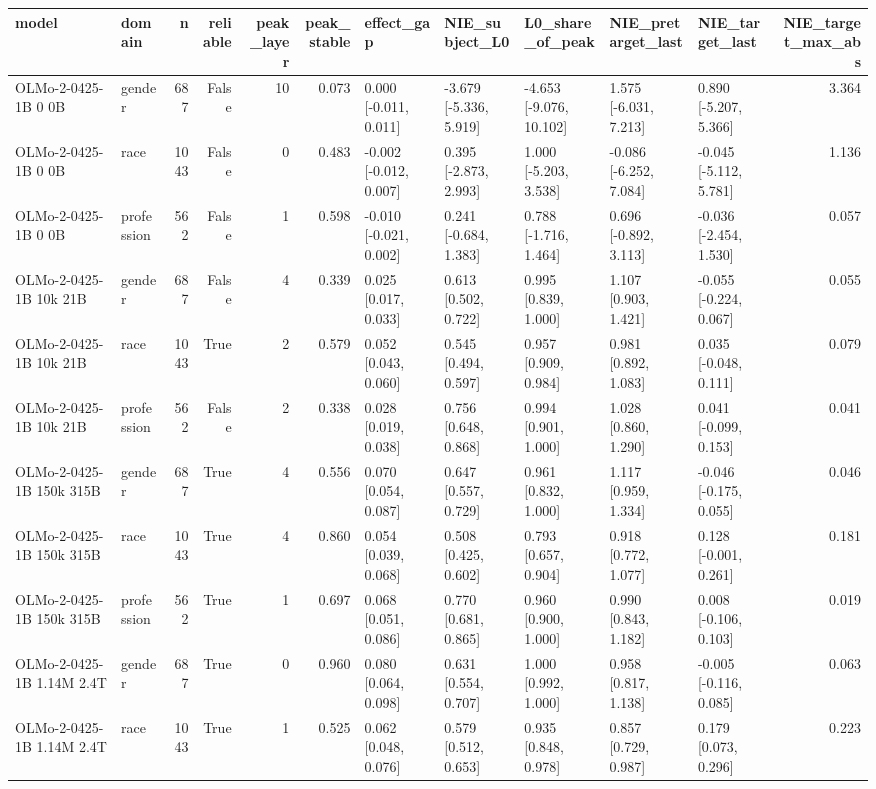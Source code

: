 \begin{tabular}{llrrrrlllllr}
\toprule
model & domain & n & reliable & peak_layer & peak_stable & effect_gap & NIE_subject_L0 & L0_share_of_peak & NIE_pretarget_last & NIE_target_last & NIE_target_max_abs \\
\midrule
OLMo-2-0425-1B 0 0B & gender & 687 & False & 10 & 0.073 & 0.000 [-0.011, 0.011] & -3.679 [-5.336, 5.919] & -4.653 [-9.076, 10.102] & 1.575 [-6.031, 7.213] & 0.890 [-5.207, 5.366] & 3.364 \\
OLMo-2-0425-1B 0 0B & race & 1043 & False & 0 & 0.483 & -0.002 [-0.012, 0.007] & 0.395 [-2.873, 2.993] & 1.000 [-5.203, 3.538] & -0.086 [-6.252, 7.084] & -0.045 [-5.112, 5.781] & 1.136 \\
OLMo-2-0425-1B 0 0B & profession & 562 & False & 1 & 0.598 & -0.010 [-0.021, 0.002] & 0.241 [-0.684, 1.383] & 0.788 [-1.716, 1.464] & 0.696 [-0.892, 3.113] & -0.036 [-2.454, 1.530] & 0.057 \\
OLMo-2-0425-1B 10k 21B & gender & 687 & False & 4 & 0.339 & 0.025 [0.017, 0.033] & 0.613 [0.502, 0.722] & 0.995 [0.839, 1.000] & 1.107 [0.903, 1.421] & -0.055 [-0.224, 0.067] & 0.055 \\
OLMo-2-0425-1B 10k 21B & race & 1043 & True & 2 & 0.579 & 0.052 [0.043, 0.060] & 0.545 [0.494, 0.597] & 0.957 [0.909, 0.984] & 0.981 [0.892, 1.083] & 0.035 [-0.048, 0.111] & 0.079 \\
OLMo-2-0425-1B 10k 21B & profession & 562 & False & 2 & 0.338 & 0.028 [0.019, 0.038] & 0.756 [0.648, 0.868] & 0.994 [0.901, 1.000] & 1.028 [0.860, 1.290] & 0.041 [-0.099, 0.153] & 0.041 \\
OLMo-2-0425-1B 150k 315B & gender & 687 & True & 4 & 0.556 & 0.070 [0.054, 0.087] & 0.647 [0.557, 0.729] & 0.961 [0.832, 1.000] & 1.117 [0.959, 1.334] & -0.046 [-0.175, 0.055] & 0.046 \\
OLMo-2-0425-1B 150k 315B & race & 1043 & True & 4 & 0.860 & 0.054 [0.039, 0.068] & 0.508 [0.425, 0.602] & 0.793 [0.657, 0.904] & 0.918 [0.772, 1.077] & 0.128 [-0.001, 0.261] & 0.181 \\
OLMo-2-0425-1B 150k 315B & profession & 562 & True & 1 & 0.697 & 0.068 [0.051, 0.086] & 0.770 [0.681, 0.865] & 0.960 [0.900, 1.000] & 0.990 [0.843, 1.182] & 0.008 [-0.106, 0.103] & 0.019 \\
OLMo-2-0425-1B 1.14M 2.4T & gender & 687 & True & 0 & 0.960 & 0.080 [0.064, 0.098] & 0.631 [0.554, 0.707] & 1.000 [0.992, 1.000] & 0.958 [0.817, 1.138] & -0.005 [-0.116, 0.085] & 0.063 \\
OLMo-2-0425-1B 1.14M 2.4T & race & 1043 & True & 1 & 0.525 & 0.062 [0.048, 0.076] & 0.579 [0.512, 0.653] & 0.935 [0.848, 0.978] & 0.857 [0.729, 0.987] & 0.179 [0.073, 0.296] & 0.223 \\

\end{tabular}
